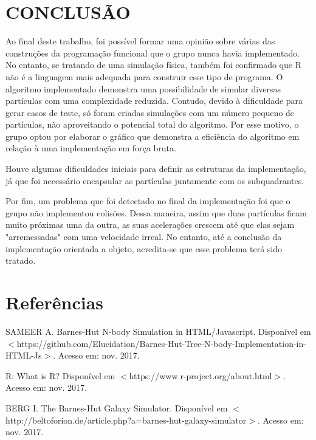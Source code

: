 \documentclass[rel_mlp]{iiufrgs}
\begin{document}
\chapter{CONCLUSÃO}

Ao final deste trabalho, foi possível formar uma opinião sobre várias das construções da programação funcional que o grupo nunca havia implementado. No entanto, se tratando de uma simulação física, também foi confirmado que R não é a linguagem mais adequada para construir esse tipo de programa.
O algoritmo implementado demonstra uma possibilidade de simular diversas partículas com uma complexidade reduzida. Contudo, devido à dificuldade para gerar casos de teste, só foram criadas simulações com um número pequeno de partículas, não aproveitando o potencial total do algoritmo. Por esse motivo, o grupo optou por elaborar o gráfico que demonstra a eficiência do algoritmo em relação à uma implementação em força bruta.

Houve algumas dificuldades iniciais para definir as estruturas da implementação, já que foi necessário encapsular
as partículas juntamente com os subquadrantes.

Por fim, um problema que foi detectado no final da implementação foi que o grupo não implementou colisões.
Dessa maneira, assim que duas partículas ficam muito próximas uma da outra, as suas acelerações crescem até que elas sejam "arremessadas" com uma velocidade irreal. No entanto, até a conclusão da implementação
orientada a objeto, acredita-se que esse problema terá sido tratado.



%
\chapter{Referências}




\noindent SAMEER A. Barnes-Hut N-body Simulation in HTML/Javascript. Disponível em $<$https://github.com/Elucidation/Barnes-Hut-Tree-N-body-Implementation-in-HTML-Js$>$. Acesso em: nov. 2017.

\noindent R: What is R? Disponível em $<$https://www.r-project.org/about.html$>$. Acesso em: nov. 2017.

\noindent BERG I. The Barnes-Hut Galaxy Simulator. Disponível em $<$http://beltoforion.de/article.php?a=barnes-hut-galaxy-simulator$>$. Acesso em: nov. 2017.
\end{document}
